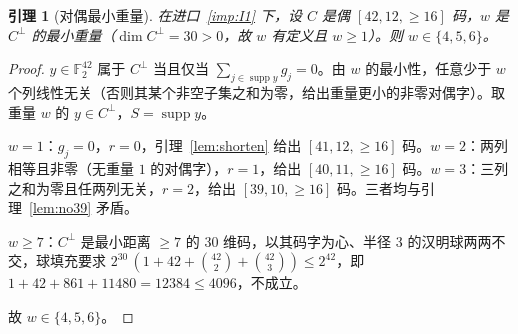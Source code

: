 \documentclass[11pt]{ctexart}
\newtheorem{lemma}{引理}
\theoremstyle{definition}
\newcommand{\F}{\mathbb{F}_2}
\newcommand{\supp}{\operatorname{supp}}
\begin{document}
\begin{lemma}[对偶最小重量]\label{lem:dual}
在进口~\ref{imp:I1} 下，设 $C$ 是偶 $[42,12,\ge16]$ 码，$w$ 是 $C^\perp$ 的最小重量（$\dim C^\perp=30>0$，故 $w$ 有定义且 $w\ge1$）。则 $w\in\{4,5,6\}$。
\end{lemma}
\begin{proof}
$y\in\F^{42}$ 属于 $C^\perp$ 当且仅当 $\sum_{j\in\supp y}g_j=0$。由 $w$ 的最小性，任意少于 $w$ 个列线性无关（否则其某个非空子集之和为零，给出重量更小的非零对偶字）。取重量 $w$ 的 $y\in C^\perp$，$S=\supp y$。

$w=1$：$g_j=0$，$r=0$，引理~\ref{lem:shorten} 给出 $[41,12,\ge16]$ 码。$w=2$：两列相等且非零（无重量 $1$ 的对偶字），$r=1$，给出 $[40,11,\ge16]$ 码。$w=3$：三列之和为零且任两列无关，$r=2$，给出 $[39,10,\ge16]$ 码。三者均与引理~\ref{lem:no39} 矛盾。

$w\ge7$：$C^\perp$ 是最小距离 $\ge7$ 的 $30$ 维码，以其码字为心、半径 $3$ 的汉明球两两不交，球填充要求 $2^{30}\,(1+42+\binom{42}{2}+\binom{42}{3})\le 2^{42}$，即 $1+42+861+11480=12384\le 4096$，不成立。

故 $w\in\{4,5,6\}$。
\end{proof}
\end{document}
